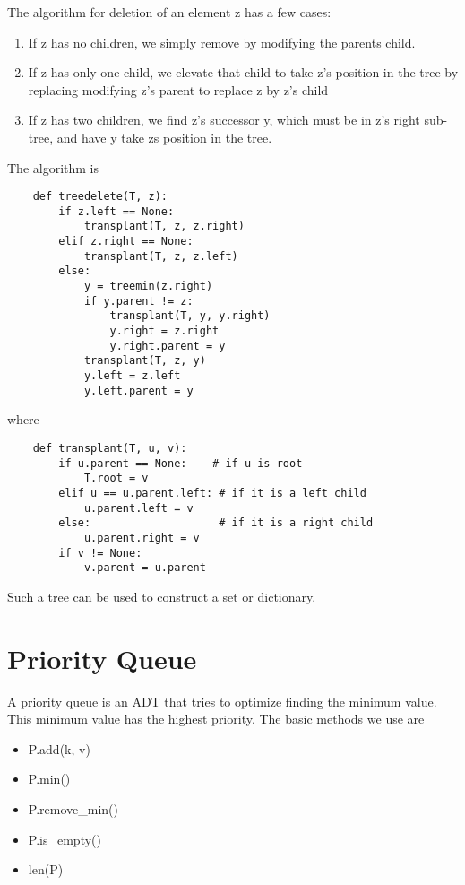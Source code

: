 \documentclass[]{article}
\begin{document}
The algorithm for deletion of an element z has a few cases:

\begin{enumerate}
	\item If z has no children, we simply remove by modifying the parents child.
	\item If z has only one child, we elevate that child to take z's position in the tree by replacing modifying z's parent to replace z by z's child
	\item If z has two children, we find z's successor y, which must be in z's right sub-tree, and have y take zs position in the tree.
\end{enumerate}\bigbreak


The algorithm is 

\begin{lstlisting}
	def treedelete(T, z):
		if z.left == None:
			transplant(T, z, z.right)
		elif z.right == None:
			transplant(T, z, z.left)
		else:
			y = treemin(z.right)
			if y.parent != z:
				transplant(T, y, y.right)
				y.right = z.right
				y.right.parent = y
			transplant(T, z, y)
			y.left = z.left
			y.left.parent = y
\end{lstlisting}\bigbreak

where 

\begin{lstlisting}
	def transplant(T, u, v):
		if u.parent == None:    # if u is root
			T.root = v
		elif u == u.parent.left: # if it is a left child
			u.parent.left = v
		else:                    # if it is a right child
			u.parent.right = v
		if v != None:
			v.parent = u.parent
\end{lstlisting}\bigbreak

Such a tree can be used to construct a set or dictionary.\\



\section{Priority Queue}\bigbreak

A priority queue is an ADT that tries to optimize finding the minimum value. This minimum value has the highest priority. The basic methods we use are

\begin{itemize}
	\item P.add(k, v) 
	\item P.min() 
	\item P.remove\_min()
	\item P.is\_empty()
	\item len(P)
\end{itemize}\bigbreak
\end{document}
